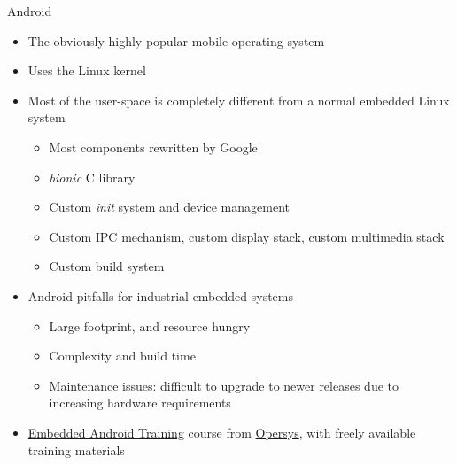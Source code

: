 \begin{frame}{Android}
  \begin{itemize}
  \item The obviously highly popular mobile operating system
  \item Uses the Linux kernel
  \item Most of the user-space is completely different from a normal
    embedded Linux system
    \begin{itemize}
    \item Most components rewritten by Google
    \item {\em bionic} C library
    \item Custom {\em init} system and device management
    \item Custom IPC mechanism, custom display stack, custom
      multimedia stack
    \item Custom build system
    \end{itemize}
  \item Android pitfalls for industrial embedded systems
    \begin{itemize}
    \item Large footprint, and resource hungry
    \item Complexity and build time
    \item Maintenance issues: difficult to upgrade to newer releases
      due to increasing hardware requirements
    \end{itemize}
  \item
    \href{https://www.opersys.com/training/embedded-android-training/}{Embedded
      Android Training} course from
    \href{https://www.opersys.com}{Opersys}, with freely available
    training materials
  \end{itemize}
\end{frame}

